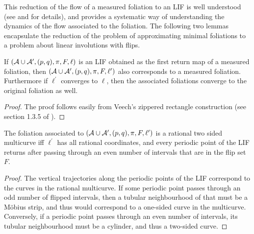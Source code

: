 \documentclass[12pt, reqno]{amsart}
\begin{document}
This reduction of the flow of a measured foliation to an LIF is well understood (see \cite{ASENS_1990_4_23_3_469_0} and \cite{boissy2009dynamics} for details), and provides a systematic way of understanding the dynamics of the flow associated to the foliation.
The following two lemmas encapsulate the reduction of the problem of approximating minimal foliations to a problem about linear involutions with flips.
\begin{lemma}
  If $(\mathcal{A} \cup \mathcal{A}^{\prime}, (p,q), \pi, F, \ell)$ is an LIF obtained as the first return map of a measured foliation, then $( \mathcal{A} \cup \mathcal{A}^{\prime}, (p,q), \pi, F, \ell^{\prime})$ also corresponds to a measured foliation.
  Furthermore if $\ell^{\prime}$ converges to $\ell$, then the associated foliations converge to the original foliation as well.
\end{lemma}
\begin{proof}
  The proof follows easily from Veech's zippered rectangle construction (see section 1.3.5 of \cite{boissy2009dynamics}).
\end{proof}

\begin{lemma}
  The foliation associated to $( \mathcal{A} \cup \mathcal{A}^{\prime}, (p,q), \pi, F, \ell^{\prime})$ is a rational two sided multicurve iff $\ell^{\prime}$ has all rational coordinates, and every periodic point of the LIF returns after passing through an even number of intervals that are in the flip set $F$.
\end{lemma}
\begin{proof}
  The vertical trajectories along the periodic points of the LIF correspond to the curves in the rational multicurve.
  If some periodic point passes through an odd number of flipped intervals, then a tubular neighbourhood of that must be a M\"obius strip, and thus would correspond to a one-sided curve in the multicurve.
  Conversely, if a periodic point passes through an even number of intervals, its tubular neighbourhood must be a cylinder, and thus a two-sided curve.
\end{proof}
\end{document}
